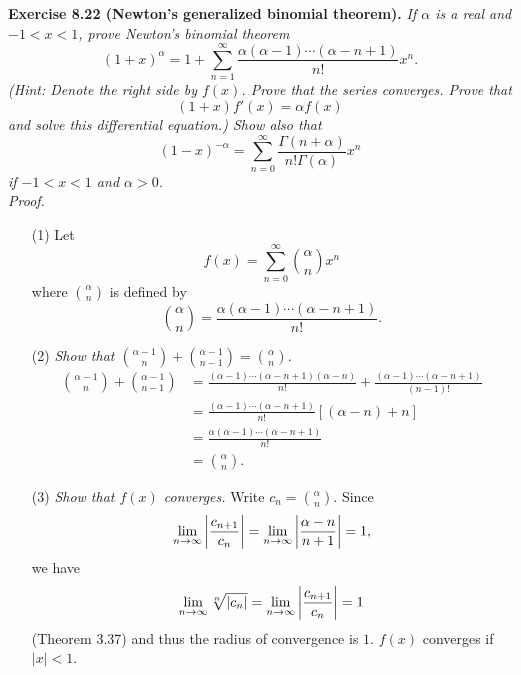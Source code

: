 \documentclass{article}
\begin{document}



\textbf{Exercise 8.22 (Newton's generalized binomial theorem).}
\emph{If $\alpha$ is a real and $-1<x<1$, prove Newton's binomial theorem
\[
  (1+x)^{\alpha}
  = 1 + \sum_{n=1}^{\infty} \frac{\alpha(\alpha-1)\cdots(\alpha-n+1)}{n!} x^n.
\]
(Hint: Denote the right side by $f(x)$.
Prove that the series converges.
Prove that
\[
  (1+x)f'(x) = \alpha f(x)
\]
and solve this differential equation.)
Show also that
\[
  (1-x)^{-\alpha} = \sum_{n=0}^{\infty} \frac{\Gamma(n+\alpha)}{n!\Gamma(\alpha)} x^n
\]
if $-1<x<1$ and $\alpha > 0$.} \\

\emph{Proof.}
\begin{enumerate}
\item[(1)]
Let
\[
  f(x) = \sum_{n=0}^{\infty} {\alpha \choose n} x^n
\]
where ${\alpha \choose n}$ is defined by
\[
  {\alpha \choose n} = \frac{\alpha(\alpha-1)\cdots(\alpha-n+1)}{n!}.
\]

\item[(2)]
\emph{Show that ${\alpha-1 \choose n} + {\alpha-1 \choose n-1} = {\alpha \choose n}$.}
\begin{align*}
  {\alpha-1 \choose n} + {\alpha-1 \choose n-1}
  &= \frac{(\alpha-1)\cdots(\alpha-n+1)(\alpha-n)}{n!}
    + \frac{(\alpha-1)\cdots(\alpha-n+1)}{(n-1)!} \\
  &= \frac{(\alpha-1)\cdots(\alpha-n+1)}{n!}[(\alpha-n) + n] \\
  &= \frac{\alpha(\alpha-1)\cdots(\alpha-n+1)}{n!} \\
  &= {\alpha \choose n}.
\end{align*}

\item[(3)]
\emph{Show that $f(x)$ converges.}
Write $c_n = {\alpha \choose n}$.
Since
\[
  \lim_{n \to \infty} \abs{ \frac{c_{n+1}}{c_{n}} }
  = \lim_{n \to \infty} \abs{ \frac{\alpha-n}{n+1} } = 1,
\]
we have
\[
  \lim_{n \to \infty} \sqrt[n]{|c_n|}
  = \lim_{n \to \infty} \abs{ \frac{c_{n+1}}{c_{n}} }
  = 1
\]
(Theorem 3.37) and thus the radius of convergence is $1$.
$f(x)$ converges if $|x| < 1$.


\end{enumerate}
\end{document}
